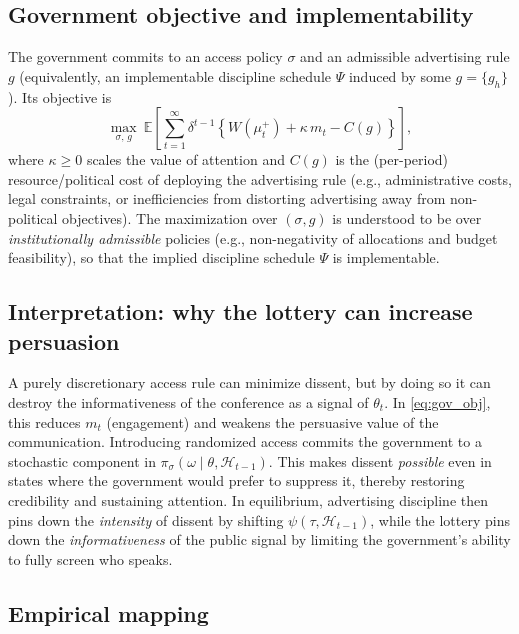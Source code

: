 \documentclass[12pt]{article}
\begin{document}
\subsection{Government objective and implementability}

The government commits to an access policy $\sigma$ and an admissible advertising rule $g$ (equivalently, an implementable discipline schedule $\Psi$ induced by some $g=\{g_h\}$). Its objective is
\begin{equation}\label{eq:gov_obj}
\max_{\sigma,\,g}\ 
\mathbb{E}\left[\sum_{t=1}^\infty \delta^{t-1}
\left\{
W(\mu_t^+) + \kappa\, m_t - C(g)
\right\}\right],
\end{equation}
where $\kappa\ge 0$ scales the value of attention and $C(g)$ is the (per-period) resource/political cost of deploying the advertising rule (e.g., administrative costs, legal constraints, or inefficiencies from distorting advertising away from non-political objectives). The maximization over $(\sigma,g)$ is understood to be over \emph{institutionally admissible} policies (e.g., non-negativity of allocations and budget feasibility), so that the implied discipline schedule $\Psi$ is implementable.

\subsection{Interpretation: why the lottery can increase persuasion}

A purely discretionary access rule can minimize dissent, but by doing so it can destroy the informativeness of the conference as a signal of $\theta_t$. In \eqref{eq:gov_obj}, this reduces $m_t$ (engagement) and weakens the persuasive value of the communication. Introducing randomized access commits the government to a stochastic component in $\pi_\sigma(\omega\mid \theta,\mathcal{H}_{t-1})$. This makes dissent \emph{possible} even in states where the government would prefer to suppress it, thereby restoring credibility and sustaining attention. In equilibrium, advertising discipline then pins down the \emph{intensity} of dissent by shifting $\psi(\tau,\mathcal{H}_{t-1})$, while the lottery pins down the \emph{informativeness} of the public signal by limiting the government's ability to fully screen who speaks.

\subsection{Empirical mapping}
\end{document}
